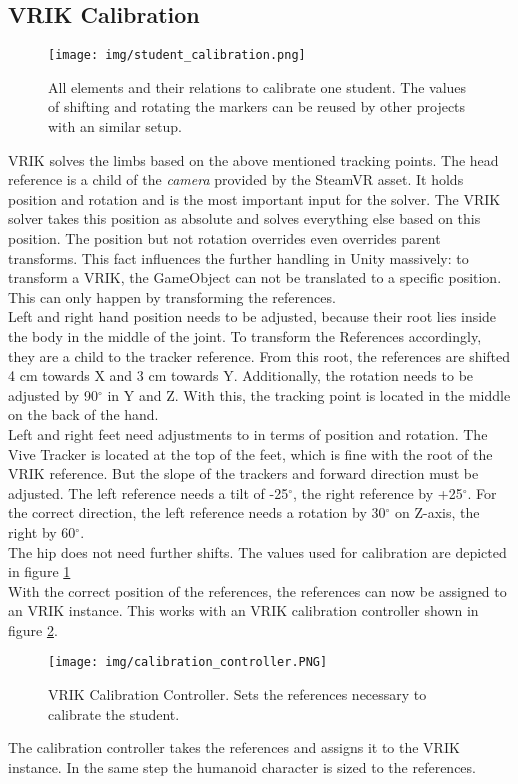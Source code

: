 \subsection{VRIK Calibration}
\begin{figure}
	\centering
	\texttt{[image: img/student\_calibration.png]}
	\caption{All elements and their relations to calibrate one student. The values of shifting and rotating the markers can be reused by other projects with an similar setup.}
	\label{fig:student_calibration}
\end{figure}
VRIK solves the limbs based on the above mentioned tracking points. The head reference is a child of the \textit{camera} provided by the SteamVR asset. It holds position and rotation and is the most important input for the solver. The VRIK solver takes this position as absolute and solves everything else based on this position. The position but not rotation overrides even overrides parent transforms. This fact influences the further handling in Unity massively: to transform a VRIK, the GameObject can not be translated to a specific position. This can only happen by transforming the references.\\
Left and right hand position needs to be adjusted, because their root lies inside the body in the middle of the joint. To transform the References accordingly, they are a child to the tracker reference. From this root, the references are shifted 4 cm towards X and 3 cm towards Y. Additionally, the rotation needs to be adjusted by 90$^\circ$ in Y and Z. With this, the tracking point is located in the middle on the back of the hand.\\
Left and right feet need adjustments to in terms of position and rotation. The Vive Tracker is located at the top of the feet, which is fine with the root of the VRIK reference. But the slope of the trackers and forward direction must be adjusted. The left reference needs a tilt of -25$^\circ$, the right reference by +25$^\circ$. For the correct direction, the left reference needs a rotation by 30$^\circ$ on Z-axis, the right by 60$^\circ$.\\
The hip does not need further shifts. The values used for calibration are depicted in figure \ref{fig:student_calibration}\\
With the correct position of the references, the references can now be assigned to an VRIK instance. This works with an VRIK calibration controller shown in figure \ref{fig:calibrationController}.
\begin{figure}
	\centering
	\texttt{[image: img/calibration\_controller.PNG]}
	\caption{VRIK Calibration Controller. Sets the references necessary to calibrate the student.}
	\label{fig:calibrationController}
\end{figure}
The calibration controller takes the references and assigns it to the VRIK instance. In the same step the humanoid character is sized to the references.
